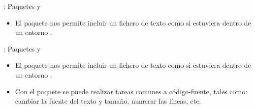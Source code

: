 \documentclass[draft]{beamer}
\begin{document}


\begin{frame}[fragile]{\insertsection: Paquetes  y }
  \begin{itemize}
  \item El paquete  nos permite incluir un fichero de
    texto como si estuviera dentro de un entorno .\\[2ex]
    \begin{exampletwouptiny}

    \end{exampletwouptiny}
  \end{itemize}
\end{frame}



\begin{frame}[fragile]{\insertsection: Paquetes  y }
  \begin{itemize}
  \item {\small El paquete  nos permite incluir un fichero de
      texto como si estuviera dentro de un entorno .}\\[2ex]
  \item {\small Con el paquete  se puede realizar
      tareas comunes a código-fuente, tales como: cambiar la fuente
      del texto y tamaño, numerar las líneas, etc.}\\[2ex]
    \begin{exampletwouptiny}
    \end{exampletwouptiny}

  \end{itemize}
\end{frame}

\end{document}
